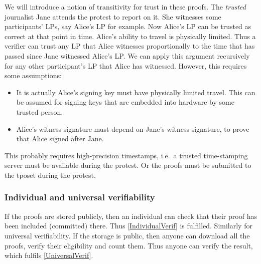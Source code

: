 We will introduce a notion of transitivity for trust in these proofs.
The \emph{trusted} journalist Jane attends the protest to report on it.
She witnesses some participants' \acp{LP}, say Alice's \ac{LP} for example.
Now Alice's \ac{LP} can be trusted as correct at that point in time.
Alice's ability to travel is physically limited.
Thus a verifier can trust any \ac{LP} that Alice witnesses proportionally to 
the time that has passed since Jane witnessed Alice's \ac{LP}.
We can apply this argument recursively for any other participant's \ac{LP} that 
Alice has witnessed.
However, this requires some assumptions:
\begin{itemize}
  \item It is actually Alice's signing key must have physically limited travel.
    This can be assumed for signing keys that are embedded into hardware by 
    some trusted person.
  \item Alice's witness signature must depend on Jane's witness signature, to 
    prove that Alice signed after Jane.
\end{itemize}
\begin{remark}
  This probably requires high-precision timestamps, i.e.\ a trusted 
  time-stamping server must be available during the protest.
  Or the proofs must be submitted to the \ac{tposet} during the protest.
\end{remark}

\subsubsection{Individual and universal verifiability}

If the proofs are stored publicly, then an individual can check that their 
proof has been included (committed) there.
Thus \cref{IndividualVerif} is fulfilled.
Similarly for universal verifiability.
If the storage is public, then anyone can download all the proofs, verify their 
eligibility and count them.
Thus anyone can verify the result, which fulfils \cref{UniversalVerif}.


